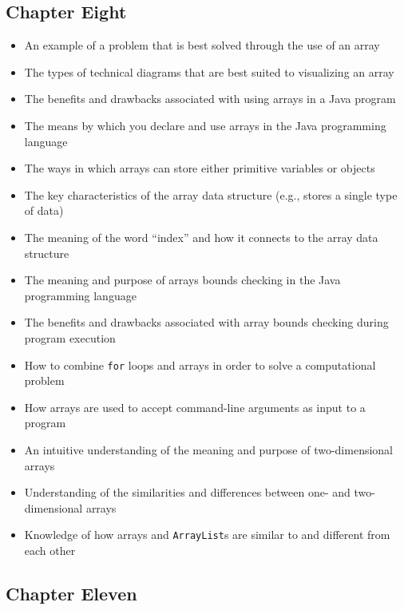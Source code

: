 \documentclass[11pt]{article}
\begin{document}
\subsection*{Chapter Eight}

\begin{itemize}

  \itemsep 0in

  \item An example of a problem that is best solved through the use of an array
  \item The types of technical diagrams that are best suited to visualizing an array
  \item The benefits and drawbacks associated with using arrays in a Java program
  \item The means by which you declare and use arrays in the Java programming language
  \item The ways in which arrays can store either primitive variables or objects
  \item The key characteristics of the array data structure (e.g., stores a single type of data)
  \item The meaning of the word ``index'' and how it connects to the array data structure
  \item The meaning and purpose of arrays bounds checking in the Java programming language
  \item The benefits and drawbacks associated with array bounds
    checking during program execution
  \item How to combine {\tt for} loops and arrays in order to solve a computational problem
  \item How arrays are used to accept command-line arguments as input to a program
  \item An intuitive understanding of the meaning and purpose of two-dimensional arrays
  \item Understanding of the similarities and differences between one- and two-dimensional arrays
  \item Knowledge of how arrays and {\tt ArrayList}s are similar to and different from each other

\end{itemize}

\subsection*{Chapter Eleven}
\end{document}
